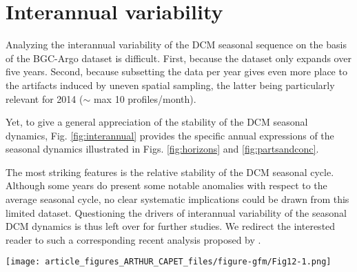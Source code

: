 \documentclass[journal abbreviation, manuscript]{copernicus}
\begin{document}
\section{Interannual variability}
\label{sec:interannual}
Analyzing the interannual variability of the DCM seasonal sequence on the basis of the BGC-Argo dataset is difficult.
First, because the dataset only expands over five years.
Second, because subsetting the data per year gives even more place to the artifacts induced by uneven spatial sampling, the latter being particularly relevant for 2014 ($\sim$ max 10 profiles/month).

Yet, to give a general appreciation of the stability of the DCM seasonal dynamics, Fig. \ref{fig:interannual} provides the specific annual expressions of the seasonal dynamics illustrated in Figs. \ref{fig:horizons} and \ref{fig:partsandconc}. 

The most striking features is the relative stability of the DCM seasonal cycle. Although some years do present some notable anomalies with respect to the average seasonal cycle, no clear systematic implications could be drawn from this limited dataset. Questioning the drivers of interannual variability of the seasonal DCM dynamics is thus left over for further studies. 
We redirect the interested reader to such a corresponding recent analysis proposed by \citet{Kubryakova2020}.

\begin{figure*}[h!] 
    \texttt{[image: article\_figures\_ARTHUR\_CAPET\_files/figure-gfm/Fig12-1.png]}
    \caption{\label{fig:interannual}
    Interannual variability (year-specific monthly medians) depicted with general monthly seasonal medians, for Figures \ref{fig:horizons}a , \ref{fig:horizons}b , \ref{fig:partsandconc}b, and \ref{fig:partsandconc}a.}
\end{figure*}


\noappendix       %



\end{document}
